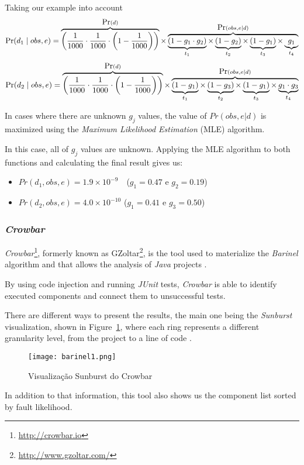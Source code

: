 Taking our example into account
%
\begin{equation}
    \mbox{Pr}(d_1 \mid obs,e) =
    \overbrace{\bigg(\frac{1}{1000} \cdot \frac{1}{1000} \cdot \bigg(1 - \frac{1}{1000}\bigg)\bigg)}^{\mbox{Pr}(d)}
    \times
    \overbrace{
      \underbrace{(1-g_1 \cdot g_2)}_{t_1}
      \times
      \underbrace{(1-g_2)}_{t_2}
      \times
      \underbrace{(1-g_1)}_{t_3}
      \times
      \underbrace{g_1}_{t_4}
    }^{\mbox{Pr}(obs,e \mid d)}
\end{equation}
%
\begin{equation}
    \mbox{Pr}(d_2 \mid obs,e) =
    \overbrace{\bigg(\frac{1}{1000} \cdot \frac{1}{1000} \cdot \bigg(1 - \frac{1}{1000}\bigg)\bigg)}^{\mbox{Pr}(d)}
    \times
    \overbrace{
      \underbrace{(1-g_1)}_{t_1}
      \times
      \underbrace{(1-g_3)}_{t_2}
      \times
      \underbrace{(1-g_1)}_{t_3}
      \times
      \underbrace{g_1 \cdot g_3}_{t_4}
    }^{\mbox{Pr}(obs,e \mid d)}
\end{equation}


In cases where there are unknown $g_j$ values, the value of $Pr(obs, e | d)$ is maximized using the \emph{Maximum Likelihood Estimation} (MLE) algorithm.

In this case, all of $g_j$ values are unknown. Applying the MLE algorithm to both functions and calculating the final result gives us:
%
\begin{itemize}
\item $Pr(d_1, obs, e) = 1.9 \times 10^{-9}$\ \ ($g_1 = 0.47$ e $g_2 = 0.19$)
\item $Pr(d_2, obs, e) = 4.0 \times 10^{-10}$ ($g_1 = 0.41$ e $g_3 = 0.50$)
\end{itemize}


% 
%
\subsubsection{\emph{Crowbar}}

\emph{Crowbar}\footnote{ \url{http://crowbar.io}}, formerly known as GZoltar\footnote{ \url{http://www.gzoltar.com/}}, is the tool used to materialize the \emph{Barinel} algorithm and that allows the analysis of \emph{Java} projects \cite{Campos2012}.

By using code injection and running \emph{JUnit} tests, \emph{Crowbar} is able to identify executed components and connect them to unsuccessful tests.

There are different ways to present the results, the main one being the \emph{Sunburst} visualization, shown in Figure~\ref{fig:crowbar-sunburst}, where each ring represents a different granularity level, from the project to a line of code \cite{Gouveia2013}.

\begin{figure}[H]
  \begin{center}
    \leavevmode
    \texttt{[image: barinel1.png]}
    \caption{Visualização Sunburst do Crowbar}
    \label{fig:crowbar-sunburst}
  \end{center}
\end{figure}

In addition to that information, this tool also shows us the component list sorted by fault likelihood.